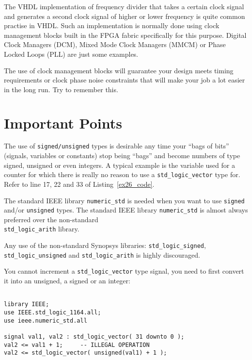The VHDL implementation of frequency divider that takes a certain clock signal and generates a second clock signal of higher or lower frequency is quite common practise in VHDL. Such an implementation is normally done using clock management blocks built in the FPGA fabric specifically for this purpose. Digital Clock Managers (DCM), Mixed Mode Clock Managers (MMCM) or Phase Locked Loops (PLL) are just some examples.

The use of clock management blocks will guarantee your design meets timing requirements or clock phase noise constraints that will make your job a lot easier in the long run. Try to remember this.

\section{Important Points}

\begin{my_list}
\item The use of \texttt{signed/unsigned} types is desirable any time your ``bags of bits'' (signals, variables or constants) stop being ``bags'' and become numbers of type signed, unsigned or even integers. A typical example is the variable used for a counter for which there is really no reason to use a \texttt{std\_logic\_vector} type for. Refer to line 17, 22 and 33 of Listing~\ref{ex26_code}.

\item The standard IEEE library \texttt{numeric\_std} is needed when you want to use \texttt{signed} and/or \texttt{unsigned} types. The standard IEEE library \texttt{numeric\_std} is almost always preferred over the non-standard\\ \texttt{std\_logic\_arith} library.
\item Any use of the non-standard Synopsys libraries: \texttt{std\_logic\_signed}, \texttt{std\_logic\_unsigned} and \texttt{std\_logic\_arith} is highly discouraged.
\item You cannot increment a \texttt{std\_logic\_vector} type signal, you need to first convert it into an unsigned, a signed or an integer:

\noindent
\begin{minipage}{0.99\linewidth}
\begin{lstlisting}

library IEEE;
use IEEE.std_logic_1164.all;
use ieee.numeric_std.all

signal val1, val2 : std_logic_vector( 31 downto 0 );
val2 <= val1 + 1;     -- ILLEGAL OPERATION
val2 <= std_logic_vector( unsigned(val1) + 1 );
\end{lstlisting}
\end{minipage}

\end{my_list}

